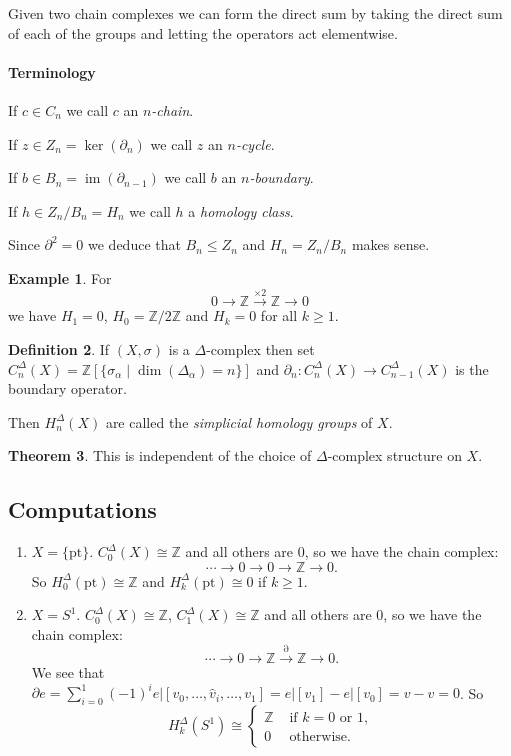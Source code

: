 \documentclass[12pt]{article}
\theoremstyle{definition}
\newtheorem{thm}{Theorem}[subsection]
\theoremstyle{definition}
\newtheorem{defn}[thm]{Definition}
\newtheorem{ex}[thm]{Example}
\newcommand{\ZZ}{\mathbb{Z}}
\DeclareMathOperator{\im}{im}
\begin{document}
Given two chain complexes we can form the direct sum by taking the direct sum of each of the groups and letting the operators act elementwise.

\paragraph{Terminology}
If $c\in C_n$ we call $c$ an \emph{$n$-chain}.

If $z\in Z_n = \ker(\partial_n)$ we call $z$ an \emph{$n$-cycle}.

If $b\in B_n = \im(\partial_{n-1})$ we call $b$ an \emph{$n$-boundary}.

If $h\in Z_n/B_n = H_n$ we call $h$ a \emph{homology class}.


Since $\partial^2 = 0$ we deduce that $B_n \le Z_n$ and $H_n = Z_n/B_n$ makes sense.

\begin{ex}
For
\[0\to\ZZ\xrightarrow{\times 2} \ZZ \to 0\]
we have $H_1 = 0$, $H_0 = \ZZ/2\ZZ$ and $H_k = 0$ for all $k \ge 1$.
\end{ex}

\begin{defn}
If $(X,\sigma)$ is a $\Delta$-complex then set $C_n^\Delta(X) = \ZZ[\{\sigma_\alpha \mid \dim(\Delta_\alpha) = n\}]$ and $\partial_n\colon C_n^\Delta(X) \to C_{n-1}^\Delta(X)$ is the boundary operator.

Then $H_n^\Delta(X)$ are called the \emph{simplicial homology groups} of $X$.
\end{defn}

\begin{thm}
This is independent of the choice of $\Delta$-complex structure on $X$.
\end{thm}

\subsection{Computations}
\begin{enumerate}
\item $X = \{\text{pt}\}$. $C_0^\Delta (X) \cong \ZZ$ and all others are 0, so we have the chain complex:
\[
\cdots \rightarrow 0 \rightarrow 0 \rightarrow \ZZ \rightarrow 0.
\]
So $H_0^\Delta(\text{pt}) \cong \ZZ$ and $H_k^\Delta(\text{pt}) \cong 0$ if $k\ge 1$.

\item $X = S^1$.
$C_0^\Delta (X) \cong \ZZ$, $C_1^\Delta (X) \cong \ZZ$ and all others are 0, so we have the chain complex:
\[
\cdots \rightarrow 0 \rightarrow \ZZ \xrightarrow{\partial} \ZZ \rightarrow 0.
\]
We see that $\partial e = \sum_{i=0}^{1} (-1)^i e|[v_0,\ldots,\hat{v}_i,\ldots,v_1] = e|[v_1] - e|[v_0] = v-v = 0$.
So 
\[H_k^\Delta(S^1) \cong\begin{cases}
\ZZ &\text{ if } k = 0 \text{ or }1, \\
0 &\text{ otherwise}.
\end{cases} \]





\end{enumerate}
\end{document}
